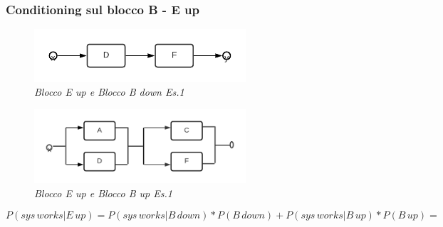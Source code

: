 \subsubsection{Conditioning sul blocco B - E up}
\begin{figure}[H]
	\centering
	\includegraphics[width=0.7\textwidth]{img/hw5/b_down.png}
	\caption{\textit{Blocco E up e Blocco B down Es.1}}
\end{figure}
\begin{figure}[H]
	\centering
	\includegraphics[width=0.7\textwidth]{img/hw5/b_up.png}
	\caption{\textit{Blocco E up e Blocco B up Es.1}}
\end{figure}
\begin{equation*}
	P(sys\,works|E\,up) = P(sys\,works|B\,down)*P(B\,down)+P(sys\,works|B\,up)*P(B\,up) =
\end{equation*}

